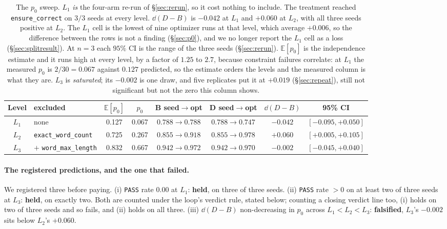 \documentclass[11pt]{article}
\begin{document}
\begin{table}[h]
\centering
\footnotesize
\begin{tabular}{clcccccc}
\toprule
Level & excluded & $\mathbb{E}[p_0]$ & $p_0$ & B seed$\to$opt & D seed$\to$opt & $\dd(D-B)$ & 95\% CI \\
\midrule
$L_1$ & none & 0.127 & 0.067 & $0.788 \to 0.788$ & $0.788 \to 0.747$ & $\mathbf{-0.042}$ & $[-0.095,+0.050]$ \\
$L_2$ & \texttt{exact\_word\_count} & 0.725 & 0.267 & $0.855 \to 0.918$ & $0.855 \to 0.978$ & $\mathbf{+0.060}$ & $[+0.005,+0.105]$ \\
$L_3$ & $+$ \texttt{word\_max\_length} & 0.832 & 0.667 & $0.942 \to 0.972$ & $0.942 \to 0.970$ & $-0.002$ & $[-0.045,+0.040]$ \\
\bottomrule
\end{tabular}
\caption{The $p_0$ sweep. $L_1$ \emph{is} the four-arm re-run of \S\ref{sec:rerun}, so it cost
nothing to include. The treatment reached \texttt{ensure\_correct} on $3/3$ seeds at every
level. $\dd(D-B)$ is $-0.042$ at $L_1$ and $+0.060$ at $L_2$, with all three seeds positive
at $L_2$. The $L_1$ cell is the lowest of nine
optimizer runs at that level, which average $+0.006$, so the difference between the rows is not
a finding (\S\ref{sec:p0}), and we no longer report the $L_1$ cell as a loss
(\S\ref{sec:splitresult}). At $n=3$ each $95\%$ CI is the range of the three seeds
(\S\ref{sec:rerun}). $\mathbb{E}[p_0]$ is the independence estimate and it runs high at
every level, by a factor of $1.25$ to $2.7$, because constraint failures correlate: at $L_1$
the measured $p_0$ is $2/30 = 0.067$ against $0.127$ predicted, so the estimate orders the levels and the
measured column is what they are. $L_3$ is \emph{saturated}; its $-0.002$ is one draw, and five replicates put it at $+0.019$ (\S\ref{sec:repeat}), still not significant but not the zero this column shows.}
\label{tab:p0}
\end{table}

\paragraph{The registered predictions, and the one that failed.} We registered three before
paying. (i) \texttt{PASS} rate $0.00$ at $L_1$: \textbf{held}, on three of three seeds.
(ii) \texttt{PASS} rate $>0$ on at least two of three seeds at $L_3$: \textbf{held}, on exactly
two. Both are counted under the loop's verdict rule, stated below; counting a closing verdict
line too, (i) holds on two of three seeds and so fails, and (ii) holds on all three. (iii) $\dd(D-B)$ non-decreasing in $p_0$ across $L_1 < L_2 < L_3$: \textbf{falsified},
$L_3$'s $-0.002$ sits below $L_2$'s $+0.060$.
\end{document}
